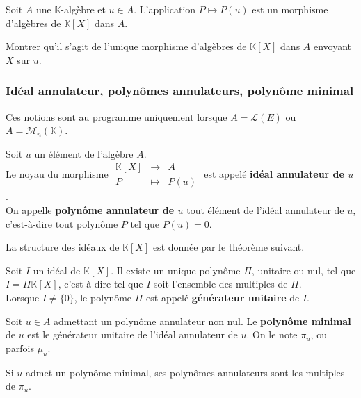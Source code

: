 \documentclass[french]{article}
\newcommand{\K}{\mathbb{K}}
\theoremstyle{plain}
\theoremstyle{definition}
\theoremstyle{remark}
\begin{document}
\begin{prop}%
	Soit $A$ une $\K$-algèbre et $u\in A$. L'application $P\mapsto P(u)$ est un morphisme d'algèbres de $\K[X]$ dans $A$.
\end{prop}

\begin{exo}
	Montrer qu'il s'agit de l'unique morphisme d'algèbres de $\K[X]$ dans $A$ envoyant $X$ sur $u$.
\end{exo}

\subsubsection*{Idéal annulateur, polynômes annulateurs, polynôme minimal}

Ces notions sont au programme uniquement lorsque $A=\mathcal{L}(E)$ ou $A=\mathcal{M}_n(\K)$.

\begin{dfn}
	Soit $u$ un élément de l'algèbre $A$. \\ Le noyau du morphisme $\begin{array}{rcl}
		\K[X]&\longrightarrow&A\\
		P&\longmapsto&P(u)
	\end{array}$ est appelé \textbf{idéal annulateur de $u$}. \\ On appelle \textbf{polynôme annulateur de $u$} tout élément de l'idéal annulateur de $u$, c'est-à-dire tout polynôme $P$ tel que $P(u)=0$.
\end{dfn}

La structure des idéaux de $\K[X]$ est donnée par le théorème suivant.

\begin{thm}%
	Soit $I$ un idéal de $\K[X]$. Il existe un unique polynôme $\Pi$, unitaire ou nul, tel que $I=\Pi\K[X]$, c'est-à-dire tel que $I$ soit l'ensemble des multiples de $\Pi$. \\
	Lorsque $I\ne \{0\}$, le polynôme $\Pi$ est appelé \textbf{générateur unitaire} de $I$.
\end{thm}

\begin{dfn}
	Soit $u\in A$ admettant un polynôme annulateur non nul. Le \textbf{polynôme minimal} de $u$ est le générateur unitaire de l'idéal annulateur de $u$. On le note $\pi_u$, ou parfois $\mu_u$.
\end{dfn}

Si $u$ admet un polynôme minimal, ses polynômes annulateurs sont les multiples de $\pi_u$.
\end{document}
